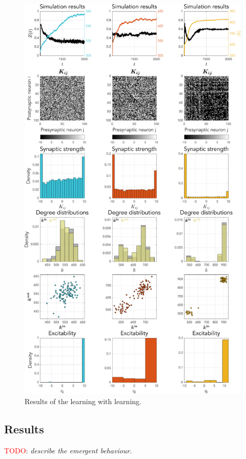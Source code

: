 \begin{figure}[H]
\centering
\includegraphics[height = \textheight]{../Figures/Learning/STDPandIP.pdf}
\caption{Results of the \STDP learning with \IP learning.}
\label{fig:STDP}
\end{figure}

\subsection{Results}
\textcolor{red}{TODO}: \textsl{describe the emergent behaviour.}

